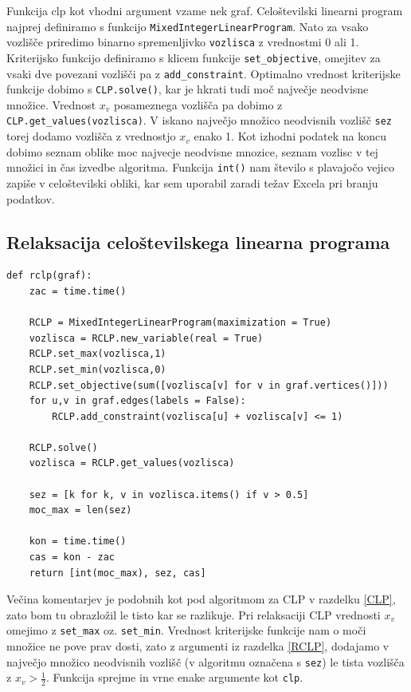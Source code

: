 \documentclass[a4paper, 12 pt]{article}
\theoremstyle{definition}
\theoremstyle{plain}
\theoremstyle{remark}
\begin{document}
Funkcija clp kot vhodni argument vzame nek graf. Celoštevilski linearni program najprej definiramo s funkcijo \verb|MixedIntegerLinearProgram|. Nato za vsako vozlišče priredimo binarno spremenljivko \verb|vozlisca| z vrednostmi 0 ali 1. Kriterijsko funkcijo definiramo s klicem funkcije \verb|set_objective|, omejitev za vsaki dve povezani vozlišči pa z \verb|add_constraint|. Optimalno vrednost kriterijske funkcije dobimo s \verb|CLP.solve()|, kar je hkrati tudi moč največje neodvisne množice. Vrednost $x_v$ posameznega vozlišča pa dobimo z \verb|CLP.get_values(vozlisca)|. V iskano največjo množico neodvisnih vozlišč \verb|sez| torej dodamo vozlišča z vrednostjo $x_v$ enako 1. Kot izhodni podatek na koncu dobimo seznam oblike moc najvecje neodvisne mnozice, seznam vozlisc v tej množici in čas izvedbe algoritma. Funkcija \verb|int()| nam število s plavajočo vejico zapiše v celoštevilski obliki, kar sem uporabil zaradi težav Excela pri branju podatkov.



\subsection{Relaksacija celoštevilskega linearna programa}
\begin{verbatim}
def rclp(graf):
    zac = time.time()

    RCLP = MixedIntegerLinearProgram(maximization = True)
    vozlisca = RCLP.new_variable(real = True)
    RCLP.set_max(vozlisca,1)
    RCLP.set_min(vozlisca,0)
    RCLP.set_objective(sum([vozlisca[v] for v in graf.vertices()]))
    for u,v in graf.edges(labels = False):
        RCLP.add_constraint(vozlisca[u] + vozlisca[v] <= 1)

    RCLP.solve()
    vozlisca = RCLP.get_values(vozlisca)

    sez = [k for k, v in vozlisca.items() if v > 0.5]
    moc_max = len(sez)

    kon = time.time()
    cas = kon - zac
    return [int(moc_max), sez, cas]
\end{verbatim}
Večina komentarjev je podobnih kot pod algoritmom za CLP v razdelku \ref{CLP}, zato bom tu obrazložil le tisto kar se razlikuje. Pri relaksaciji CLP vrednosti $x_v$ omejimo z \verb|set_max| oz. \verb|set_min|. Vrednost kriterijske funkcije nam o moči množice ne pove prav dosti, zato z argumenti iz razdelka \ref{RCLP}, dodajamo v največjo množico neodvisnih vozlišč (v algoritmu označena s \verb|sez|) le tista vozlišča z $x_v > \frac{1}{2}$. Funkcija sprejme in vrne enake argumente kot \verb|clp|.
\end{document}
